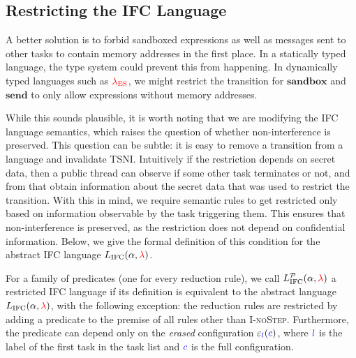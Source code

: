 \documentclass{llncs}
\newcommand{\Red}[1]{{\color{red} #1}}
\begin{document}
\subsection{Restricting the IFC Language}

A better solution is to forbid sandboxed expressions as well
as messages sent to other tasks to contain memory addresses in the
first place.  In a statically typed language, the type system could
prevent this from happening.
In dynamically typed languages such as \ensuremath{\Red{\lambda_{\text{ES}}}}, we might
restrict the transition for \ensuremath{\mathbf{sandbox}} and \ensuremath{\mathbf{send}} to only allow expressions
without memory addresses.

While this sounds plausible, it is worth noting that we are modifying the IFC language semantics,
which raises the question of whether non-interference is preserved.
This question can be subtle: it is easy to remove a transition from
a language and invalidate TSNI.  Intuitively
if the restriction depends on secret data, then a public thread
can observe if some other task terminates or not, and from that obtain
information about the secret data that was used to restrict the
transition.
With this in mind, we require semantic rules to get restricted only
based on information observable by the task triggering them.
This ensures that non-interference is preserved, as the
restriction does not depend on confidential information.
Below, we give the formal definition of this condition for the
abstract IFC language \ensuremath{L_\text{IFC}(\alpha,\Red{\lambda})}.














\begin{definition}
  \label{def:restricted}
  For a family of predicates  (one for every reduction
  rule), we call
  \ensuremath{L_\text{IFC}^{\mathcal{P}}(\alpha,\Red{\lambda})} a restricted IFC language
  if its definition is equivalent to the abstract language
  \ensuremath{L_\text{IFC}(\alpha,\Red{\lambda})}, with the following exception:
  the reduction rules are restricted
  by adding a predicate  to the premise of
  all rules other than \textsc{I-noStep}.  Furthermore, the predicate 
  can depend only on the \textit{erased} configuration
  \ensuremath{\varepsilon_{\ifc{l}}(\ifc{c})}, where \ensuremath{\ifc{l}} is the label of the first task
  in the task list and \ensuremath{\ifc{c}} is the full configuration.
\end{definition}
\end{document}
